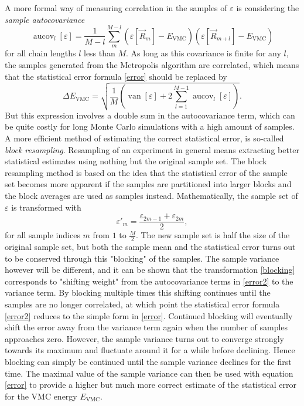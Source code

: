 \documentclass[a4paper,8pt]{article}
\DeclareMathOperator{\van}{van}
\DeclareMathOperator{\aucov}{aucov}
\begin{document}
\begin{multicols}{2}
A more formal way of measuring correlation in the samples of $\varepsilon$ is considering the \textit{sample autocovariance}
\begin{equation}
\aucov_l[\varepsilon] = \frac{1}{M-l}\sum\limits_m^{M-l} \left(\varepsilon[\vec{R}_m]-E_\text{VMC}\right)\left(\varepsilon[\vec{R}_{m+l}]-E_\text{VMC}\right)
\end{equation}
for all chain lengths $l$ less than $M$. As long as this covariance is finite for any $l$, the samples generated from the Metropolis algorithm are correlated, which means that the statistical error formula \eqref{error} should be replaced by
\begin{equation}\label{error2}
\Delta E_\text{VMC} = \sqrt{\frac{1}{M} \left(\van[\varepsilon]+2\sum\limits_{l=1}^{M-1} \aucov_l[\varepsilon]\right)}.
\end{equation}
But this expression involves a double sum in the autocovariance term, which can be quite costly for long Monte Carlo simulations with a high amount of samples. A more efficient method of estimating the correct statistical error, is so-called \textit{block resampling}. Resampling of an experiment in general means extracting better statistical estimates using nothing but the original sample set. The block resampling method is based on the idea that the statistical error of the sample set becomes more apparent if the samples are partitioned into larger blocks and the block averages are used as samples instead. Mathematically, the sample set of $\varepsilon$ is transformed with
\begin{equation}\label{blocking}
\varepsilon'_m = \frac{\varepsilon_{2m-1}+\varepsilon_{2m}}{2},
\end{equation}
for all sample indices $m$ from $1$ to $\frac{M}{2}$. The new sample set is half the size of the original sample set, but both the sample mean and the statistical error turns out to be conserved through this "blocking" of the samples. The sample variance however will be different, and it can be shown that the transformation \eqref{blocking} corresponds to "shifting weight" from the autocovariance terms in \eqref{error2} to the variance term. By blocking multiple times this shifting continues until the samples are no longer correlated, at which point the statistical error formula \eqref{error2} reduces to the simple form in \eqref{error}. Continued blocking will eventually shift the error away from the variance term again when the number of samples approaches zero. However, the sample variance turns out to converge strongly towards its maximum and fluctuate around it for a while before declining. Hence blocking can simply be continued until the sample variance declines for the first time. The maximal value of the sample variance can then be used with equation \eqref{error} to provide a higher but much more correct estimate of the statistical error for the VMC energy $E_\text{VMC}$.



\end{multicols}
\end{document}
